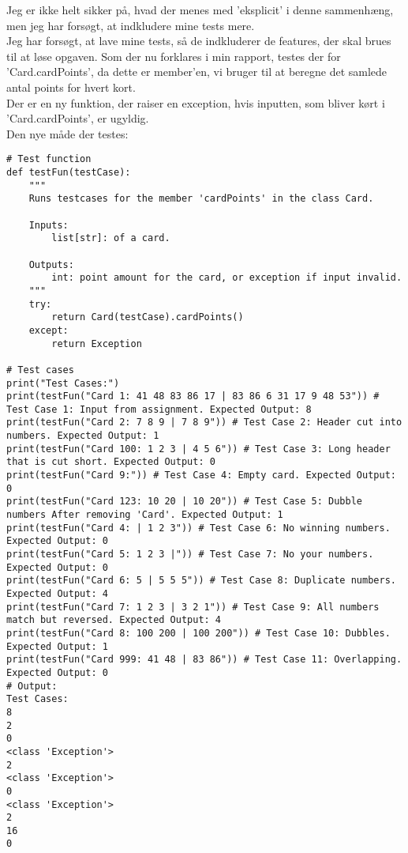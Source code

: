 \documentclass[a4paper,12pt]{article}
\begin{document}
Jeg er ikke helt sikker på, hvad der menes med 'eksplicit' i denne sammenhæng, men jeg har forsøgt, at indkludere mine tests mere.\\
Jeg har forsøgt, at lave mine tests, så de indkluderer de features, der skal brues til at løse opgaven. Som der nu forklares i min rapport, testes der for 'Card.cardPoints', da dette er member'en, vi bruger til at beregne det samlede antal points for hvert kort.\\
Der er en ny funktion, der raiser en exception, hvis inputten, som bliver kørt i 'Card.cardPoints', er ugyldig.\\
Den nye måde der testes:

\begin{lstlisting}
# Test function
def testFun(testCase):
    """
    Runs testcases for the member 'cardPoints' in the class Card.
    
    Inputs:
        list[str]: of a card.
        
    Outputs:
        int: point amount for the card, or exception if input invalid.
    """
    try:
        return Card(testCase).cardPoints()
    except:
        return Exception
    
# Test cases
print("Test Cases:")
print(testFun("Card 1: 41 48 83 86 17 | 83 86 6 31 17 9 48 53")) # Test Case 1: Input from assignment. Expected Output: 8
print(testFun("Card 2: 7 8 9 | 7 8 9")) # Test Case 2: Header cut into numbers. Expected Output: 1
print(testFun("Card 100: 1 2 3 | 4 5 6")) # Test Case 3: Long header that is cut short. Expected Output: 0
print(testFun("Card 9:")) # Test Case 4: Empty card. Expected Output: 0
print(testFun("Card 123: 10 20 | 10 20")) # Test Case 5: Dubble numbers After removing 'Card'. Expected Output: 1
print(testFun("Card 4: | 1 2 3")) # Test Case 6: No winning numbers. Expected Output: 0
print(testFun("Card 5: 1 2 3 |")) # Test Case 7: No your numbers. Expected Output: 0
print(testFun("Card 6: 5 | 5 5 5")) # Test Case 8: Duplicate numbers. Expected Output: 4
print(testFun("Card 7: 1 2 3 | 3 2 1")) # Test Case 9: All numbers match but reversed. Expected Output: 4
print(testFun("Card 8: 100 200 | 100 200")) # Test Case 10: Dubbles. Expected Output: 1
print(testFun("Card 999: 41 48 | 83 86")) # Test Case 11: Overlapping. Expected Output: 0
# Output:
Test Cases:
8
2
0
<class 'Exception'>
2
<class 'Exception'>
0
<class 'Exception'>
2
16
0
\end{lstlisting}
\end{document}
